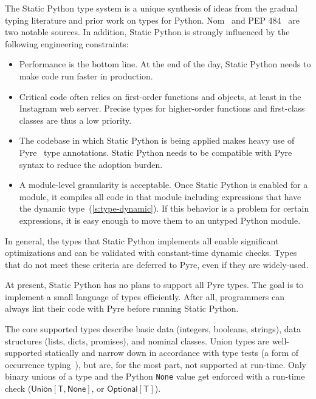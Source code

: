 \documentclass[english,cleveref,submission]{programming}
\newcommand{\SP}{Static Python}
\newcommand{\code}[1]{\texttt{#1}}
\newcommand{\typefont}[1]{\mathsf{#1}}
\newcommand{\paramtype}[2]{#1[#2]}
\newcommand{\sptype}{\typefont{T}}
\newcommand{\sptnone}{\typefont{None}}
\newcommand{\sptoptional}[1]{\paramtype{\typefont{Optional}}{#1}}
\newcommand{\sptunion}[1]{\paramtype{\typefont{Union}}{#1}}
\begin{document}
The \SP{} type system is a unique synthesis of ideas from the gradual typing literature
and prior work on types for Python.
Nom~\cite{mt-oopsla-2017,mt-oopsla-2021} and PEP 484~\cite{pep484} are two notable sources.
In addition, \SP{} is strongly influenced by the following engineering constraints:
\begin{itemize}
  \item
    Performance is the bottom line.
    At the end of the day, \SP{} needs to make code run faster in production.
  \item
    Critical code often relies on first-order functions and objects,
    at least in the Instagram web server.
    Precise types for higher-order functions and first-class classes
    are thus a low priority.
  \item
    The codebase in which \SP{} is being applied makes heavy use of Pyre~\cite{pyre}
    type annotations.
    \SP{} needs to be compatible with Pyre syntax to reduce the adoption burden.
  \item
    A module-level granularity is acceptable.
    Once \SP{} is enabled for a module, it compiles all code in that module
    including expressions that have the dynamic type~(\cref{s:type-dynamic}).
    If this behavior is a problem for certain expressions, it is easy enough to move
    them to an untyped Python module.
\end{itemize}
%
In general, the types that \SP{} implements all enable significant optimizations
and can be validated with constant-time dynamic checks.
Types that do not meet these criteria are deferred to Pyre, even if they are widely-used.

At present, \SP{} has no plans to support all Pyre types.
The goal is to implement a small language of types efficiently.
After all, programmers can always lint their code with Pyre before running
\SP{}.

The core supported types describe basic data (integers, booleans, strings),
data structures (lists, dicts, promises),
and nominal classes.
Union types are well-supported statically and narrow down in accordance
with type tests (a form of occurrence typing~\cite{tf-icfp-2010,gsk-esop-2011}),
but are, for the most part, not supported at run-time.
Only binary unions of a type and the Python \code{None} value get enforced with a run-time check
($\sptunion{\sptype, \sptnone}$, or $\sptoptional{\sptype}$).
\end{document}
